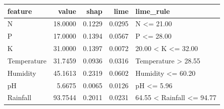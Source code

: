 \begin{tabular}{lrrrl}
\toprule
feature & value & shap & lime & lime_rule \\
\midrule
N & 18.0000 & 0.1229 & 0.0295 & N <= 21.00 \\
P & 17.0000 & 0.1394 & 0.0567 & P <= 28.00 \\
K & 31.0000 & 0.1397 & 0.0072 & 20.00 < K <= 32.00 \\
Temperature & 31.7459 & 0.0936 & 0.0316 & Temperature > 28.55 \\
Humidity & 45.1613 & 0.2319 & 0.0602 & Humidity <= 60.20 \\
pH & 5.6675 & 0.0065 & 0.0126 & pH <= 5.96 \\
Rainfall & 93.7544 & 0.2011 & 0.0231 & 64.55 < Rainfall <= 94.77 \\
\bottomrule
\end{tabular}
